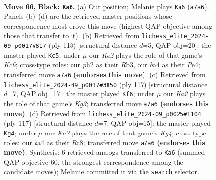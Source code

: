 \documentclass[11pt]{article}
\begin{document}
\clearpage

\begin{figure}[p]\centering
\begin{subfigure}{0.46\textwidth}\centering
\resizebox{\linewidth}{!}{%
\newchessgame
\chessboard[
  setfen={8/k7/8/2R2p2/B4P2/4K3/7P/8 b - - 4 66},
  showmover=false,
  pgfstyle=straightmove, color=movearrow, markmove={a7-a6}
]}
\caption{}
\end{subfigure}\hfill
\begin{subfigure}{0.46\textwidth}\centering
\resizebox{\linewidth}{!}{%
\newchessgame
\chessboard[
  setfen={8/4k3/2K2p2/8/r2PP3/1R6/8/8 w - - 1 60},
  showmover=false,
  pgfstyle=straightmove, color=movearrow, markmove={c6-c5}
]}
\caption{}
\end{subfigure}
\\[4pt]
\begin{subfigure}{0.46\textwidth}\centering
\resizebox{\linewidth}{!}{%
\newchessgame
\chessboard[
  setfen={R7/8/6k1/8/p7/8/KP6/8 b - - 1 59},
  showmover=false,
  pgfstyle=straightmove, color=movearrow, markmove={g6-f6}
]}
\caption{}
\end{subfigure}\hfill
\begin{subfigure}{0.46\textwidth}\centering
\resizebox{\linewidth}{!}{%
\newchessgame
\chessboard[
  setfen={2r5/7R/8/6k1/1P6/1K5p/8/8 b - - 1 59},
  showmover=false,
  pgfstyle=straightmove, color=movearrow, markmove={g5-g4}
]}
\caption{}
\end{subfigure}
\caption{\textbf{Move 66, Black: \texttt{Ka6}.} (a) Our position; Melanie plays \texttt{Ka6} (\texttt{a7a6}). Panels (b)--(d) are the retrieved master positions whose correspondence most drove this move (highest QAP objective among those that transfer to it). (b) Retrieved from \texttt{lichess\_elite\_2024-09\_p0017\#817} (ply 118) [structural distance $d$=5, QAP obj=20]: the master played \texttt{Kc5}; under $\mu$ our \emph{Ka2} plays the role of that game's \emph{Kc6}; cross-type roles: our \emph{p}h2 as their \emph{R}b3, our \emph{b}a4 as their \emph{P}e4; transferred move \texttt{a7a6} \textbf{(endorses this move)}. (c) Retrieved from \texttt{lichess\_elite\_2024-09\_p0017\#3850} (ply 117) [structural distance $d$=7, QAP obj=17]: the master played \texttt{Kf6}; under $\mu$ our \emph{Ka2} plays the role of that game's \emph{Kg3}; transferred move \texttt{a7a6} \textbf{(endorses this move)}. (d) Retrieved from \texttt{lichess\_elite\_2024-09\_p0025\#1104} (ply 117) [structural distance $d$=7, QAP obj=15]: the master played \texttt{Kg4}; under $\mu$ our \emph{Ka2} plays the role of that game's \emph{Kg4}; cross-type roles: our \emph{b}a4 as their \emph{R}c8; transferred move \texttt{a7a6} \textbf{(endorses this move)}. Synthesis: 6 retrieved analogs transferred to \texttt{Ka6} (summed QAP objective 60, the strongest correspondence among the candidate moves); Melanie committed it via the \texttt{search} selector.}
\label{fig:thought-m131}
\end{figure}
\end{document}
